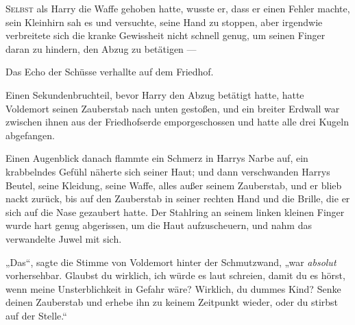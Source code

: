 
\lettrine{S}{elbst} als Harry die Waffe gehoben hatte, wusste er, dass er einen Fehler machte, sein Kleinhirn sah es und versuchte, seine Hand zu stoppen, aber irgendwie verbreitete sich die kranke Gewissheit nicht schnell genug, um seinen Finger daran zu hindern, den Abzug zu betätigen —

Das Echo der Schüsse verhallte auf dem Friedhof.

Einen Sekundenbruchteil, bevor Harry den Abzug betätigt hatte, hatte Voldemort seinen Zauberstab nach unten gestoßen, und ein breiter Erdwall war zwischen ihnen aus der Friedhofserde emporgeschossen und hatte alle drei Kugeln abgefangen.

Einen Augenblick danach flammte ein Schmerz in Harrys Narbe auf, ein krabbelndes Gefühl näherte sich seiner Haut; und dann verschwanden Harrys Beutel, seine Kleidung, seine Waffe, alles außer seinem Zauberstab, und er blieb nackt zurück, bis auf den Zauberstab in seiner rechten Hand und die Brille, die er sich auf die Nase gezaubert hatte. Der Stahlring an seinem linken kleinen Finger wurde hart genug abgerissen, um die Haut aufzuscheuern, und nahm das verwandelte Juwel mit sich.

„Das“, sagte die Stimme von Voldemort hinter der Schmutzwand, „war \emph{absolut} vorhersehbar. Glaubst du wirklich, ich würde es laut schreien, damit du es hörst, wenn meine Unsterblichkeit in Gefahr wäre? Wirklich, du dummes Kind? Senke deinen Zauberstab und erhebe ihn zu keinem Zeitpunkt wieder, oder du stirbst auf der Stelle.“

